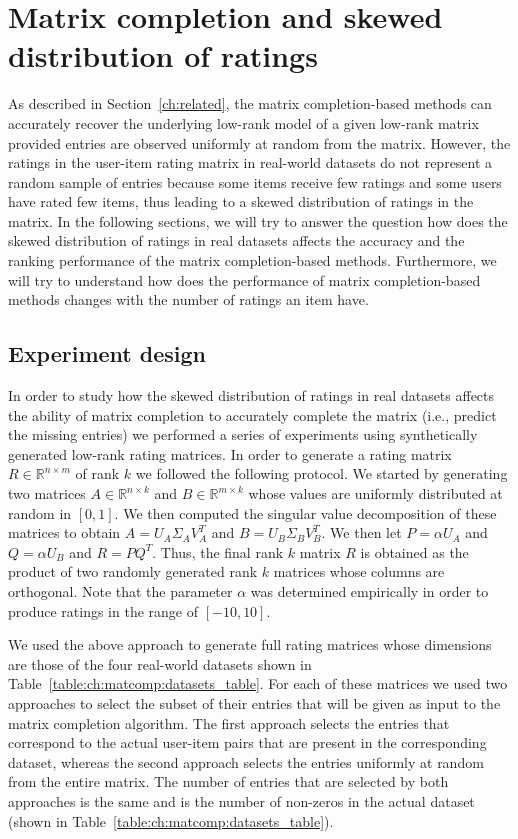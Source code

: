 
\section{Matrix completion and skewed distribution of ratings} \label{ch:matcomp:hypoexp}
As described in Section~\ref{ch:related}, the matrix completion-based methods
can accurately recover the underlying low-rank model of a given low-rank matrix
provided entries are observed uniformly at random from the matrix.
However, the ratings in the user-item rating matrix in real-world datasets
do not represent a random sample of entries because some items receive few
ratings and some users have rated few items, thus leading to a skewed distribution of 
ratings in the matrix.
In the following sections, we will try to answer the question how does the skewed 
distribution of ratings in real datasets affects the accuracy and the ranking
performance of the matrix completion-based methods. 
Furthermore, we will try to understand how does the performance of matrix
completion-based methods changes with the number of ratings an item have.

\subsection{Experiment design} \label{sec:ch:matcomp:expdesign}
In order to study how the skewed distribution of ratings in real datasets
affects the ability of matrix completion to accurately complete the matrix (i.e.,
predict the missing entries) we performed a series of experiments using synthetically
generated low-rank rating matrices. 
%
In order to generate a rating matrix $R\in \mathbb{R}^{n\times m}$ of rank $k$ we
followed the following protocol. We started by generating two matrices
$A\in\mathbb{R}^{n\times k}$ and $B\in\mathbb{R}^{m\times k}$ whose values are
uniformly distributed at random in $[0, 1]$. We then computed the singular value
decomposition of these matrices to obtain $A=U_A\Sigma_A V_A^T$ and $B=U_B\Sigma_B
V_B^T$. We then let $P=\alpha U_A$ and $Q=\alpha U_B$ and $R = PQ^T$. Thus, the final
rank $k$ matrix $R$ is obtained as the product of two randomly generated rank $k$
matrices whose columns are orthogonal. Note that the parameter $\alpha$ was
determined empirically in order to produce ratings in the range of $[-10, 10]$.

We used the above approach to generate full rating matrices whose dimensions are
those of the four real-world datasets shown in Table~\ref{table:ch:matcomp:datasets_table}. For
each of these matrices we used two approaches to select the subset of their entries
that will be given as input to the matrix completion algorithm. The first approach
selects the entries that correspond to the actual user-item pairs that are present in
the corresponding dataset, whereas the second approach selects the entries uniformly
at random from the entire matrix. The number of entries that are selected by both
approaches is the same and is the number of non-zeros in the actual dataset (shown in
Table~\ref{table:ch:matcomp:datasets_table}). 


